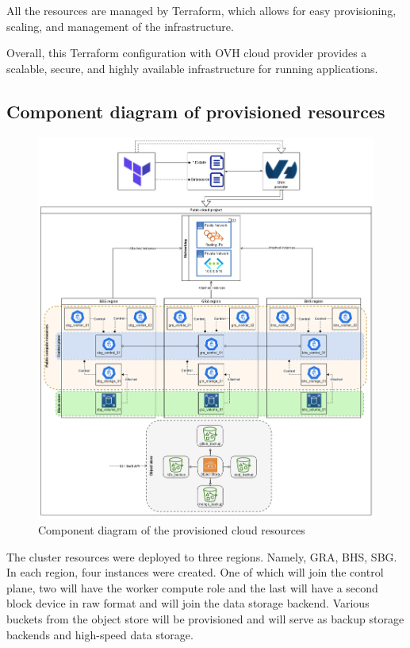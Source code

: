 \hspace{7mm}All the resources are managed by Terraform, which allows for easy provisioning, scaling, and management of the infrastructure. 

\hspace{7mm}Overall, this Terraform configuration with OVH cloud provider provides a scalable, secure, and highly available infrastructure for running applications. 

\subsection{Component diagram of provisioned resources}

\begin{figure}[H]\centering
\includegraphics[width=1.0\textwidth,angle=00]{assets/f15.png}
\caption{Component diagram of the provisioned cloud resources}
\label{fig:fig15}
\end{figure}

\hspace{7mm}The cluster resources were deployed to three regions. Namely, GRA, BHS, SBG. In each region, four instances were created. One of which will join the control plane, two will have the worker compute role and the last will have a second block device in raw format and will join the data storage backend. Various buckets from the object store will be provisioned and will serve as backup storage backends and high-speed data storage.

